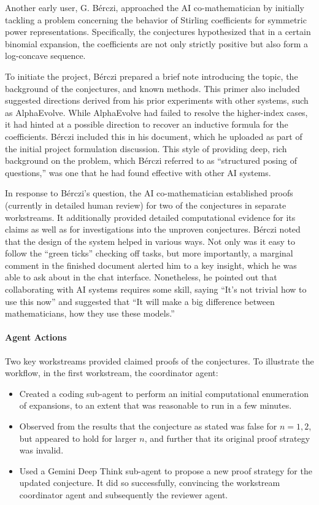 \documentclass[11pt, a4paper, copyright, gdm]{google}
\begin{document}
Another early user, G. B\'erczi, approached the AI co-mathematician by initially tackling a problem
concerning the behavior of Stirling coefficients for symmetric power representations.
Specifically, the conjectures hypothesized that in a certain binomial expansion, the coefficients are not only strictly positive but also form a log-concave sequence.

To initiate the project, B\'erczi prepared a brief note introducing the topic, the background of the
conjectures, and known methods.
This primer also included suggested directions derived from his prior experiments with other systems, such as AlphaEvolve.
While AlphaEvolve had failed to resolve the higher-index cases, it had hinted at a possible direction to recover an inductive formula for the coefficients.
B\'erczi included this in his document, which he uploaded as part of the initial project formulation discussion.
This style of providing deep, rich background on the problem, which B\'erczi referred to as ``structured posing of questions,'' was one that he had found effective with other AI systems.

In response to B\'erczi's question, the AI co-mathematician established proofs (currently in detailed human review) for two of the conjectures in separate workstreams.
It additionally provided detailed computational evidence for its claims as well as for investigations into the unproven conjectures.
B\'erczi noted that the design of the system helped in various ways.
Not only was it easy to follow the ``green ticks'' checking off tasks, but more importantly, a marginal comment in the finished document alerted him to a key insight, which he was able to ask about in the chat interface.
Nonetheless, he pointed out that collaborating with AI systems requires some skill, saying ``It's not trivial how to use this now'' and suggested that ``It will make a big difference between mathematicians, how they use these models.''

\paragraph{Agent Actions}

Two key workstreams provided claimed proofs of the conjectures.
To illustrate the workflow, in the first workstream, the coordinator agent:
\begin{itemize}
     \item Created a coding sub-agent to perform an initial computational enumeration of expansions, to an extent that was reasonable to run in a few minutes.
     \item Observed from the results that the conjecture as stated was false for $n = 1, 2$, but appeared to hold for larger $n$, and further that its original proof strategy was invalid.
     \item Used a Gemini Deep Think sub-agent to propose a new proof strategy for the updated conjecture.
     It did so successfully, convincing the workstream coordinator agent and subsequently the reviewer agent.
\end{itemize}
\end{document}
